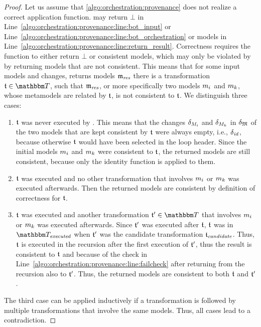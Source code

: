 \begin{proof}
    Let us assume that \autoref{algo:orchestration:provenance} does not realize a correct application function.
     may return $\bot$ in Line~\ref{algo:orchestration:provenance:line:bot_input} or Line~\ref{algo:orchestration:provenance:line:bot_orchestration} or models in Line~\ref{algo:orchestration:provenance:line:return_result}.
    Correctness requires the function to either return $\bot$ or consistent models, which may only be violated by  by returning models that are not consistent.
    This means that for some input models and changes,  returns models $\mathfrak{m}_{\mathit{res}}$ there is a transformation $\transformation{t} \in \transformationset{T}$, such that $\mathfrak{m}_{\mathit{res}}$, or more specifically two models $m_{i}$ and $m_{k}$, 
    whose metamodels are related by $\mathfrak{t}$, is not consistent to $\mathfrak{t}$.
    We distinguish three cases:
    \begin{enumerate}
        \item $\mathfrak{t}$ was never executed by . This means that the changes $\delta_{M_{i}}$ and $\delta_{M_{k}}$ in $\delta_{\mathfrak{M}}$ of the two models that are kept consistent by $\mathfrak{t}$ were always empty, i.e., $\delta_{\mathit{id}}$, because otherwise $\mathfrak{t}$ would have been selected in the loop header. Since the initial models $m_{i}$ and $m_{k}$ were consistent to $\mathfrak{t}$, the returned models are still consistent, because only the identity function is applied to them.
        \item $\mathfrak{t}$ was executed and no other transformation that involves $m_{i}$ or $m_{k}$ was executed afterwards. Then the returned models are consistent by definition of correctness for $\mathfrak{t}$.
        \item $\mathfrak{t}$ was executed and another transformation $\transformation{t}' \in \transformationset{T}$ that involves $m_{i}$ or $m_{k}$ was executed afterwards.
        Since $\mathfrak{t}'$ was executed after $\mathfrak{t}$, $\mathfrak{t}$ was in $\provalgexecuted$ when $\mathfrak{t}'$ was the candidate transformation $\mathfrak{t}_{\mathit{candidate}}$.
        Thus, $\mathfrak{t}$ is executed in the recursion after the first execution of $\mathfrak{t}'$, thus the result is consistent to $\mathfrak{t}$ and because of the check in Line~\ref{algo:orchestration:provenance:line:failcheck} after returning from the recursion also to $\mathfrak{t}'$. Thus, the returned models are consistent to both $\mathfrak{t}$ and $\mathfrak{t}'$.
    \end{enumerate}
    The third case can be applied inductively if a transformation is followed by multiple transformations that involve the same models. Thus, all cases lead to a contradiction.
\end{proof}

